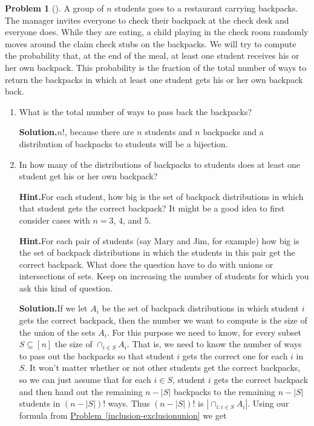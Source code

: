 \documentclass[10pt,]{book}
\theoremstyle{plain}
\theoremstyle{definition}
\newtheorem{activity}[project]{Problem}
\theoremstyle{definition}
\numberwithin{equation}{chapter}
\begin{document}
\begin{activity}[]\label{hatcheck}
A group of \(n\) students goes to a restaurant carrying backpacks. The manager invites everyone to check their backpack at the check desk and everyone does. While they are eating, a child playing in the check room randomly moves around the claim check stubs on the backpacks. We will try to compute the probability that, at the end of the meal, at least one student receives his or her own backpack.  This probability is the fraction of the total number of ways to return the backpacks in which at least one student gets his or her own backpack back.%
\begin{enumerate}[font=\bfseries,label=(\alph*),ref=\alph*]
\item\label{task-164} What is the total number of ways to pass back the backpacks?%
\par\medskip\noindent%
\textbf{Solution.}\quad \(n!\), because there are \(n\) students and \(n\) backpacks and a distribution of backpacks to students will be a bijection.%
\item\label{task-165} In how many of the distributions of backpacks to students does at least one student get his or her own backpack?%
\par\medskip\noindent%
\textbf{Hint.}\quad For each student, how big is the set of backpack distributions in which that student gets the correct backpack?  It might be a good idea to first consider cases with \(n=3\), \(4\), and \(5\).%
\par\medskip\noindent%
\textbf{Hint.}\quad For each pair of students (say Mary and Jim, for example) how big is the set of backpack distributions in which the students in this pair get the correct backpack. What does the question have to do with unions or intersections of sets. Keep on increasing the number of students for which you ask this kind of question.%
\par\medskip\noindent%
\textbf{Solution.}\quad If we let \(A_i\) be the set of backpack distributions in which student \(i\) gets the correct backpack, then the number we want to compute is the size of the union of the sets \(A_i\). For this purpose we need to know, for every subset \(S\subseteq [n]\) the size of \(\cap_{i\in S}A_i\). That is, we need to know the number of ways to pass out the backpacks so that student \(i\) gets the correct one for each \(i\) in \(S\). It won't matter whether or not other students get the correct backpacks, so we can just assume that for each \(i\in S\), student \(i\) gets the correct backpack and then hand out the remaining \(n-|S|\) backpacks to the remaining \(n-|S|\) students in \((n-|S|)!\) ways. Thus \((n-|S|)!\) is \(|\cap_{i:i\in S}A_i|\). Using our formula from \hyperref[inclusion-exclusionunion]{Problem~\ref{inclusion-exclusionunion}} we get%

\end{enumerate}
\end{activity}
\end{document}
